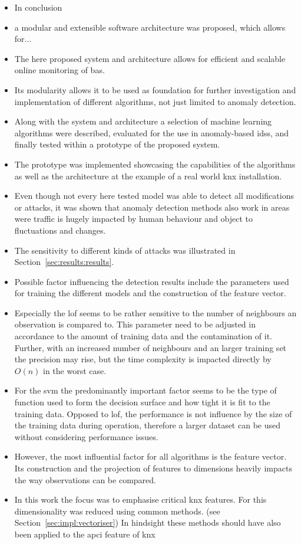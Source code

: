 \begin{itemize}
	\item In conclusion
	\item a modular and extensible software architecture was proposed, which allows for...
	\item The here proposed system and architecture allows for efficient and scalable online monitoring of \gls{bas}.
	\item Its modularity allows it to be used as foundation for further investigation and implementation of different algorithms, not just limited to anomaly detection.
	\item Along with the system and architecture a selection of machine learning algorithms were described, evaluated for the use in anomaly-based \glspl{ids}, and finally tested within a prototype of the proposed system.
	\item The prototype was implemented showcasing the capabilities of the algorithms as well as the architecture at the example of a real world \gls{knx} installation.
	\item Even though not every here tested model was able to detect all modifications or attacks, it was shown that anomaly detection methods also work in areas were traffic is hugely impacted by human behaviour and object to fluctuations and changes.
	\item The sensitivity to different kinds of attacks was illustrated in Section~\ref{sec:results:results}.
	
	\item Possible factor influencing the detection results include the parameters used for training the different models and the construction of the feature vector.
	\item Especially the \gls{lof} seems to be rather sensitive to the number of neighbours an observation is compared to. This parameter need to be adjusted in accordance to the amount of training data and the contamination of it. Further, with an increased number of neighbours and an larger training set the precision may rise, but the time complexity is impacted directly by \(O(n)\) in the worst case.
	\item For the \gls{svm} the predominantly important factor seems to be the type of function used to form the decision surface and how tight it is fit to the training data. Opposed to \gls{lof}, the performance is not influence by the size of the training data during operation, therefore a larger dataset can be used without considering performance issues.
	\item However, the most influential factor for all algorithms is the feature vector. Its construction and the projection of features to dimensions heavily impacts the way observations can be compared.
	\item In this work the focus was to emphasise critical \gls{knx} features. For this dimensionality was reduced using common methods. (see Section~\ref{sec:impl:vectoriser}) In hindsight these methods should have also been applied to the \gls{apci} feature of \gls{knx}
	

\end{itemize}
